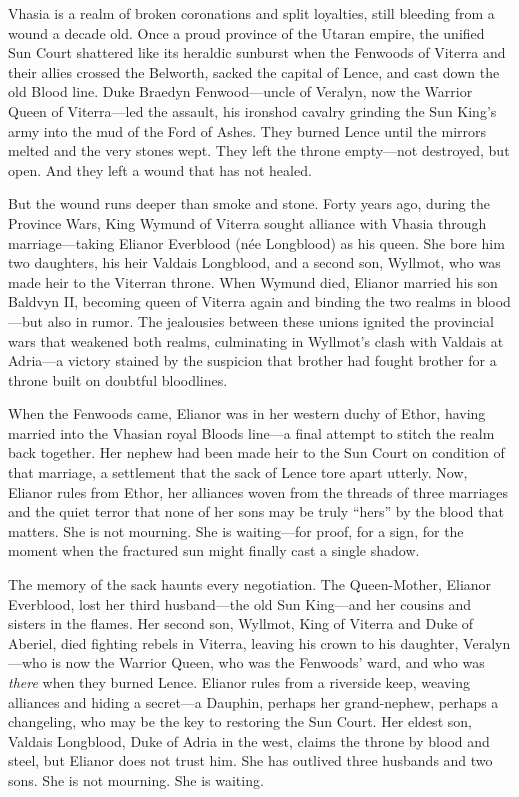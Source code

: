 \vspace{2mm}
\begin{tcolorbox}[colback=black!3,colframe=blue!60!black,title={Theme \& Atmosphere},breakable]
Vhasia is a realm of broken coronations and split loyalties, still bleeding from a wound a decade old. Once a proud province of the Utaran empire, the unified Sun Court shattered like its heraldic sunburst when the Fenwoods of Viterra and their allies crossed the Belworth, sacked the capital of Lence, and cast down the old Blood line. Duke Braedyn Fenwood---uncle of Veralyn, now the Warrior Queen of Viterra---led the assault, his ironshod cavalry grinding the Sun King's army into the mud of the Ford of Ashes. They burned Lence until the mirrors melted and the very stones wept. They left the throne empty---not destroyed, but open. And they left a wound that has not healed.

But the wound runs deeper than smoke and stone. Forty years ago, during the Province Wars, King Wymund of Viterra sought alliance with Vhasia through marriage---taking Elianor Everblood (née Longblood) as his queen. She bore him two daughters, his heir Valdais Longblood, and a second son, Wyllmot, who was made heir to the Viterran throne. When Wymund died, Elianor married his son Baldvyn II, becoming queen of Viterra again and binding the two realms in blood---but also in rumor. The jealousies between these unions ignited the provincial wars that weakened both realms, culminating in Wyllmot's clash with Valdais at Adria---a victory stained by the suspicion that brother had fought brother for a throne built on doubtful bloodlines.

When the Fenwoods came, Elianor was in her western duchy of Ethor, having married into the Vhasian royal Bloods line---a final attempt to stitch the realm back together. Her nephew had been made heir to the Sun Court on condition of that marriage, a settlement that the sack of Lence tore apart utterly. Now, Elianor rules from Ethor, her alliances woven from the threads of three marriages and the quiet terror that none of her sons may be truly ``hers'' by the blood that matters. She is not mourning. She is waiting---for proof, for a sign, for the moment when the fractured sun might finally cast a single shadow.

The memory of the sack haunts every negotiation. The Queen-Mother, Elianor Everblood, lost her third husband---the old Sun King---and her cousins and sisters in the flames. Her second son, Wyllmot, King of Viterra and Duke of Aberiel, died fighting rebels in Viterra, leaving his crown to his daughter, Veralyn---who is now the Warrior Queen, who was the Fenwoods' ward, and who was \textit{there} when they burned Lence. Elianor rules from a riverside keep, weaving alliances and hiding a secret---a Dauphin, perhaps her grand-nephew, perhaps a changeling, who may be the key to restoring the Sun Court. Her eldest son, Valdais Longblood, Duke of Adria in the west, claims the throne by blood and steel, but Elianor does not trust him. She has outlived three husbands and two sons. She is not mourning. She is waiting.


\end{tcolorbox}
